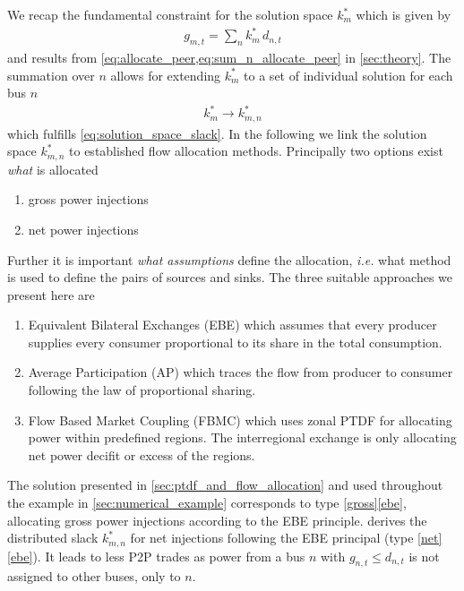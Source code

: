 \documentclass[11pt,twocolumn]{article}
\newcommand{\ie}{\textit{i.e.} }
\newcommand{\nodalgeneration}[1][n]{g_{#1,t}}
\newcommand{\nodaldemand}[1][n]{d_{#1,t}}
\newcommand{\slackk}[1][n]{k^*_{#1}}
\newcommand{\Slackk}{k^*_{m,n}}
\begin{document}
We recap the fundamental constraint for the solution space $\slackk[m]$ which is given by 
% 
\begin{align}
\nodalgeneration[m] = \sum_n \slackk[m] \, \nodaldemand  
\label{eq:solution_space_slack}
\end{align}
% 
and results from \cref{eq:allocate_peer,eq:sum_n_allocate_peer} in \cref{sec:theory}. The summation over $n$ allows for extending $\slackk[m]$ to a set of individual solution for each bus $n$
% 
\begin{align}
\slackk[m] \rightarrow \Slackk  
\end{align}
which fulfills \cref{eq:solution_space_slack}. In the following we link the solution space $\Slackk$ to established flow allocation methods. Principally two options exist \textit{what} is allocated 
% 
\begin{enumerate}
\item gross power injections \label{gross}
\item net power injections \label{net}
\end{enumerate}
% 
Further it is important \textit{what assumptions} define the allocation, \ie what method is used to define the pairs of sources and sinks. The three suitable approaches we present here are
% 
\begin{enumerate}[label=\alph*., ref=\alph*]
\item Equivalent Bilateral Exchanges (EBE) \cite{galiana_transmission_2003} which assumes
that every producer supplies every consumer proportional to its share in the total consumption. \label{ebe} 
\item Average Participation (AP) \cite{bialek_tracing_1996,achayuthakan_electricity_2010-1} which traces the flow from producer to consumer following the law of proportional sharing. \label{ap}
\item Flow Based Market Coupling (FBMC) which uses zonal PTDF for allocating power within predefined regions. The interregional exchange is only allocating net power decifit or excess of the regions. \label{fbmc}
\end{enumerate}
% 
The solution presented in \cref{sec:ptdf_and_flow_allocation} and used throughout the example in \cref{sec:numerical_example} corresponds to type \ref{gross}\ref{ebe}, allocating gross power injections according to the EBE principle.  derives the distributed slack $\Slackk$ for net injections following the EBE principal (type \ref{net}\ref{ebe}). It leads to less P2P trades as power from a bus $n$ with $\nodalgeneration \le \nodaldemand$ is not assigned to other buses, only to $n$. 
\end{document}

